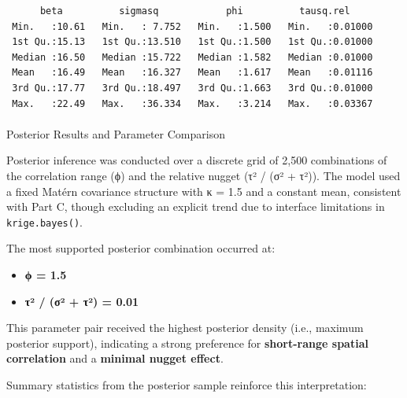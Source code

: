 \documentclass[
  11pt,
]{article}
\makeatletter
\let\oldparagraph\paragraph
\renewcommand{\paragraph}{
    \@ifstar
      \xxxParagraphStar
      \xxxParagraphNoStar
  }
\newcommand{\xxxParagraphStar}[1]{\oldparagraph*{#1}\mbox{}}
\newcommand{\xxxParagraphNoStar}[1]{\oldparagraph{#1}\mbox{}}
\makeatother
\begin{document}
\begin{verbatim}
      beta          sigmasq            phi          tausq.rel      
 Min.   :10.61   Min.   : 7.752   Min.   :1.500   Min.   :0.01000  
 1st Qu.:15.13   1st Qu.:13.510   1st Qu.:1.500   1st Qu.:0.01000  
 Median :16.50   Median :15.722   Median :1.582   Median :0.01000  
 Mean   :16.49   Mean   :16.327   Mean   :1.617   Mean   :0.01116  
 3rd Qu.:17.77   3rd Qu.:18.497   3rd Qu.:1.663   3rd Qu.:0.01000  
 Max.   :22.49   Max.   :36.334   Max.   :3.214   Max.   :0.03367  
\end{verbatim}

\paragraph{Posterior Results and Parameter
Comparison}\label{posterior-results-and-parameter-comparison}

Posterior inference was conducted over a discrete grid of 2,500
combinations of the correlation range (ϕ) and the relative nugget (τ² /
(σ² + τ²)). The model used a fixed Matérn covariance structure with κ =
1.5 and a constant mean, consistent with Part C, though excluding an
explicit trend due to interface limitations in \texttt{krige.bayes()}.

The most supported posterior combination occurred at:

\begin{itemize}
\item
  \textbf{ϕ = 1.5}
\item
  \textbf{τ² / (σ² + τ²) = 0.01}
\end{itemize}

This parameter pair received the highest posterior density (i.e.,
maximum posterior support), indicating a strong preference for
\textbf{short-range spatial correlation} and a \textbf{minimal nugget
effect}.

Summary statistics from the posterior sample reinforce this
interpretation:
\end{document}
